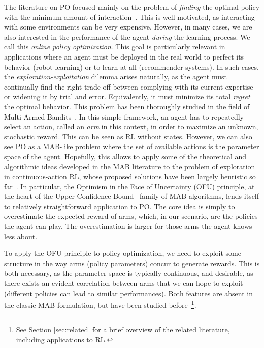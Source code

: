 \documentclass{article}
\begin{document}
The literature on PO focused mainly on the problem of \textit{finding} the optimal policy with the minimum amount of interaction~\cite{sutton2000policy,sehnke2008policy,silver2014deterministic,schulman2015trust,mnih2016asynchronous,espeholt2018impala}. This is well motivated, as interacting with some environments can be very expensive. However, in many cases, we are also interested in the performance of the agent \textit{during} the learning process. We call this \textit{online policy optimization}. This goal is particularly relevant in applications where an agent must be deployed in the real world to perfect its behavior (\eg robot learning) or to learn at all (\eg recommender systems). In such cases, the \textit{exploration-exploitation} dilemma arises naturally, as the agent must continually find the right trade-off between complying with its current expertise or widening it by trial and error. Equivalently, it must minimize its total \textit{regret} \wrt the optimal behavior. This problem has been thoroughly studied in the field of Multi Armed Bandits~\citep[MAB,][]{auer2002finite,lattimore2019bandit}. In this simple framework, an agent has to repeatedly select an action, called an \textit{arm} in this context, in order to maximize an unknown, stochastic reward. This can be seen as RL without states. However, we can also see PO as a MAB-like problem where the set of available actions is the parameter space of the agent. Hopefully, this allows to apply some of the theoretical and algorithmic ideas developed in the MAB literature to the problem of exploration in continuous-action RL, whose proposed solutions have been largely heuristic so far~\citep{houthooft2016vime,haarnoja2017reinforcement,haarnoja2018soft}. In particular, the Optimism in the Face of Uncertainty (OFU) principle, at the heart of the Upper Confidence Bound~\citep[UCB,][]{lai1985asymptotically,agrawal1995sample,auer2002using} family of MAB algorithms, lends itself to relatively straightforward application to PO. The core idea is simply to overestimate the expected reward of arms, which, in our scenario, are the policies the agent can play. The overestimation is larger for those arms the agent knows less about.

To apply the OFU principle to policy optimization, we need to exploit some structure in the way arms (policy parameters) concur to generate rewards. This is both necessary, as the parameter space is typically continuous, and desirable, as there exists an evident correlation between arms that we can hope to exploit (different policies can lead to similar performances). Both features are absent in the classic MAB formulation, but have been studied before~\citep[\eg][]{pandey2007multi,kleinberg2005nearly}\footnote{See Section \ref{sec:related} for a brief overview of the related literature, including applications to RL.}.
\end{document}
